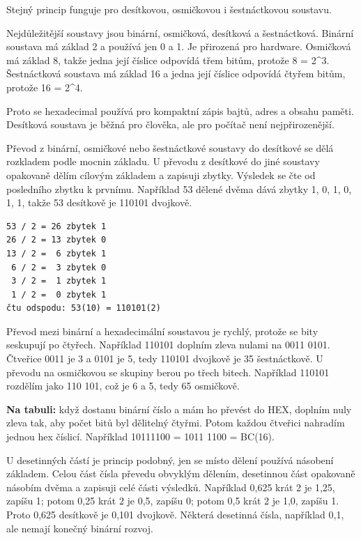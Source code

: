 \documentclass[11pt,a4paper]{article}
\newcommand{\itpr}[1]{\medskip\noindent\colorbox{green!8}{\parbox{\dimexpr\linewidth-2\fboxsep}{#1}}\medskip}
\begin{document}
Stejný princip funguje pro desítkovou, osmičkovou i šestnáctkovou soustavu.

Nejdůležitější soustavy jsou binární, osmičková, desítková a šestnáctková. Binární soustava má základ 2 a používá jen 0 a 1. Je přirozená pro hardware. Osmičková má základ 8, takže jedna její číslice odpovídá třem bitům, protože 8 = 2\textasciicircum{}3. Šestnáctková soustava má základ 16 a jedna její číslice odpovídá čtyřem bitům, protože 16 = 2\textasciicircum{}4.

Proto se hexadecimal používá pro kompaktní zápis bajtů, adres a obsahu paměti. Desítková soustava je běžná pro člověka, ale pro počítač není nejpřirozenější.

Převod z binární, osmičkové nebo šestnáctkové soustavy do desítkové se dělá rozkladem podle mocnin základu. U převodu z desítkové do jiné soustavy opakovaně dělím cílovým základem a zapisuji zbytky. Výsledek se čte od posledního zbytku k prvnímu. Například 53 dělené dvěma dává zbytky 1, 0, 1, 0, 1, 1, takže 53 desítkově je 110101 dvojkově.

\begin{codebox}
\small
\begin{verbatim}
53 / 2 = 26 zbytek 1
26 / 2 = 13 zbytek 0
13 / 2 =  6 zbytek 1
 6 / 2 =  3 zbytek 0
 3 / 2 =  1 zbytek 1
 1 / 2 =  0 zbytek 1
čtu odspodu: 53(10) = 110101(2)
\end{verbatim}
\end{codebox}

Převod mezi binární a hexadecimální soustavou je rychlý, protože se bity seskupují po čtyřech. Například 110101 doplním zleva nulami na 0011 0101. Čtveřice 0011 je 3 a 0101 je 5, tedy 110101 dvojkově je 35 šestnáctkově. U převodu na osmičkovou se skupiny berou po třech bitech. Například 110101 rozdělím jako 110 101, což je 6 a 5, tedy 65 osmičkově.

\itpr{\textbf{Na tabuli:} když dostanu binární číslo a mám ho převést do HEX, doplním nuly zleva tak, aby počet bitů byl dělitelný čtyřmi. Potom každou čtveřici nahradím jednou hex číslicí. Například 10111100 = 1011 1100 = BC(16).}

U desetinných částí je princip podobný, jen se místo dělení používá násobení základem. Celou část čísla převedu obvyklým dělením, desetinnou část opakovaně násobím dvěma a zapisuji celé části výsledků. Například 0,625 krát 2 je 1,25, zapíšu 1; potom 0,25 krát 2 je 0,5, zapíšu 0; potom 0,5 krát 2 je 1,0, zapíšu 1. Proto 0,625 desítkově je 0,101 dvojkově. Některá desetinná čísla, například 0,1, ale nemají konečný binární rozvoj.
\end{document}
